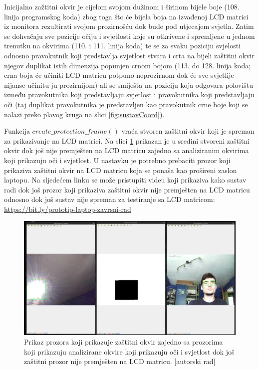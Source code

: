 \documentclass{foi}
\begin{document}
Inicijalno zažtitni okvir je cijelom svojom dužinom i širinom bijele boje (108. linija programskog koda) zbog toga što će bijela boja na izvađenoj LCD matrici iz monitora rezultirati svojom prozirnošću dok bude pod utjecajem svjetla. Zatim se dohvačaju sve pozicije očiju i svjetlosti koje su otkrivene i spremljene u jednom trenutku na okvirima (110. i 111. linija koda) te se za svaku poziciju svjelosti odnosno pravokutnik koji predstavlja svjetlost stvara i crta na bijeli zaštitni okvir njegov duplikat istih dimenzija popunjen crnom bojom (113. do 128. linija koda; crna boja će učiniti LCD matricu potpuno neprozirnom dok će sve svjetlije nijanse učinitu ju prozirnijom) ali se smiješta na poziciju koja odgovara polovištu između pravokutnika koji predstavljaju svjetlost i pravokutnika koji predstavljaju oči (taj duplikat pravokutnika je predstavljen kao pravokutnik crne boje koji se nalazi preko plavog kruga na slici \ref{fig:sustavCoord}).

\newpage
Funkcija $create\_protection\_frame()$ vraća stvoren zaštitni okvir koji je spreman za prikazivanje na LCD matrici. Na slici \ref{fig:zastitni_okvir} prikazan je u sredini stvoreni zaštitni okvir dok još nije premješten na LCD matricu zajedno sa analiziranim okvirima koji prikazuju oči i svjetlost. U nastavku je potrebno prebaciti prozor koji prikaziva zaštitni okvir na LCD matricu koja se ponaša kao prošireni zaslon laptopu. Na sljedećem linku se može pristupiti videu koji prikaziva kako sustav radi dok još prozor koji prikaziva zaštitni okvir nije premješten na LCD matricu odnosno dok još sustav nije spreman za testiranje sa LCD matricom: \url{https://bit.ly/prototip-laptop-zavrsni-rad}

\begin{figure}[h!]
    \centering
    \includegraphics[width=1\textwidth]{slike/zastitni_okvir}
    \caption{Prikaz prozora koji prikazuje zaštitni okvir zajedno sa prozorima koji prikazuju analizirane okvire koji prikazuju oči i svjetlost dok još zaštitni prozor nije premješten na LCD matricu. [autorski rad]}
    \label{fig:zastitni_okvir}
\end{figure}
\end{document}
